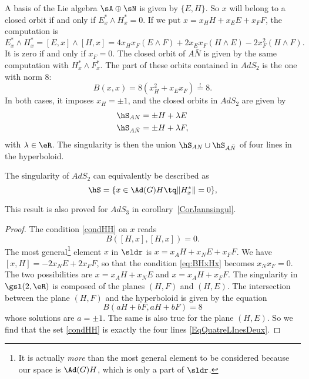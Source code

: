 A basis of the Lie algebra $\sA\oplus\sN$ is given by $\{E,H\}$. So $x$ will belong to a closed orbit if and only if $E_x^*\wedge H^*_x=0$. If we put $x=x_HH+x_EE+x_FF$, the computation is
\[
E_x^*\wedge H^*_x=[E,x]\wedge[H,x]
                 =4x_Hx_F (E\wedge F)+2x_Ex_F (H\wedge E)-2x_F^2 (H\wedge F).
\]
It is zero if and only if $x_F=0$. The closed orbit of $A\bar{N}$ is given by the same computation with $H^*_x\wedge F^*_x$. The part of these orbits contained in $AdS_2$ is the one with norm $8$:
\[
B(x,x)=8(x_H^2+x_Ex_F)\stackrel{!}{=}8.
\]
In both cases, it imposes $x_H=\pm 1$, and the closed orbits in $AdS_2$ are given by
\begin{subequations}\label{EqQuatreLInesDeux}
\begin{align}
\hS_{AN}&=\pm H+\lambda E\\
\hS_{A\bar N}&=\pm H+\lambda F,
\end{align}
\end{subequations}
with $\lambda\in\eR$. The singularity is then the union $\hS_{AN}\cup\hS_{A\bar N}$ of four lines in the hyperboloid.

\begin{proposition} \label{PropAdSDeuxJannule}
     The singularity of $AdS_2$ can equivalently be described as
    \begin{equation}\label{condHH}
        \hS=\{x \in \Ad(G)H \tq \|H^*_x\|=0\},
    \end{equation}
\end{proposition}
This result is also proved for \( AdS_3\) in corollary~\ref{CorJannsingul}.

\begin{proof}
The condition \eqref{condHH} on $x$ reads
\begin{equation}\label{eq:BHxHx}
B([H,x],[H,x])=0.
\end{equation}
The most general\footnote{It is actually \emph{more} than the most general element to be considered because our space is $\Ad(G)H$, which is only a part of $\sldr$.} element $x$ in $\sldr$ is $x=x_AH+x_NE+x_FF$. We have $[x,H]=-2x_NE+2x_FF$, so that the condition \eqref{eq:BHxHx} becomes $x_Nx_F=0$. The two possibilities are $x=x_AH+x_NE$ and $x=x_AH+x_FF$. The singularity in $\gsl(2,\eR)$ is composed of the planes $(H,F)$ and $(H,E)$. The intersection between the plane $(H,F)$ and the hyperboloid is given by the equation
\[
B(aH+bF,aH+bF)=8
\]
whose solutions are $a=\pm 1$. The same is also true for the plane $(H,E)$. So we find that the set \eqref{condHH} is exactly the four lines  \eqref{EqQuatreLInesDeux}.

\end{proof}

